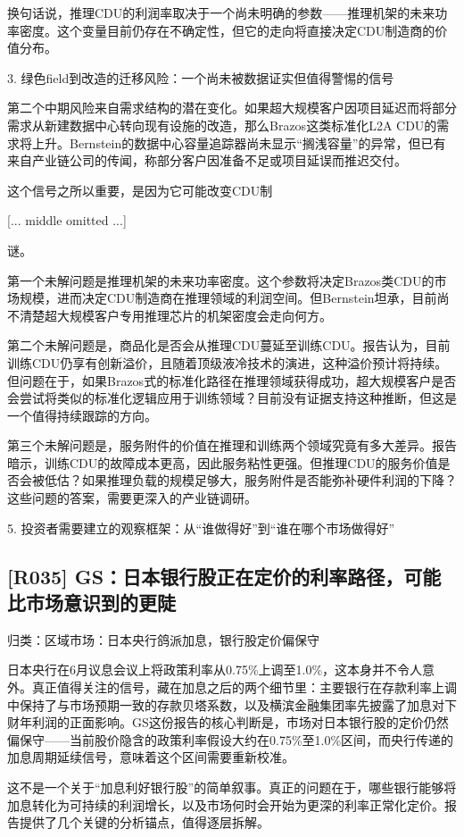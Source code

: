 \documentclass[11pt]{ctexart}
\begin{document}
换句话说，推理CDU的利润率取决于一个尚未明确的参数——推理机架的未来功率密度。这个变量目前仍存在不确定性，但它的走向将直接决定CDU制造商的价值分布。

3. 绿色field到改造的迁移风险：一个尚未被数据证实但值得警惕的信号

第二个中期风险来自需求结构的潜在变化。如果超大规模客户因项目延迟而将部分需求从新建数据中心转向现有设施的改造，那么Brazos这类标准化L2A CDU的需求将上升。Bernstein的数据中心容量追踪器尚未显示“搁浅容量”的异常，但已有来自产业链公司的传闻，称部分客户因准备不足或项目延误而推迟交付。

这个信号之所以重要，是因为它可能改变CDU制

[... middle omitted ...]

谜。

第一个未解问题是推理机架的未来功率密度。这个参数将决定Brazos类CDU的市场规模，进而决定CDU制造商在推理领域的利润空间。但Bernstein坦承，目前尚不清楚超大规模客户专用推理芯片的机架密度会走向何方。

第二个未解问题是，商品化是否会从推理CDU蔓延至训练CDU。报告认为，目前训练CDU仍享有创新溢价，且随着顶级液冷技术的演进，这种溢价预计将持续。但问题在于，如果Brazos式的标准化路径在推理领域获得成功，超大规模客户是否会尝试将类似的标准化逻辑应用于训练领域？目前没有证据支持这种推断，但这是一个值得持续跟踪的方向。

第三个未解问题是，服务附件的价值在推理和训练两个领域究竟有多大差异。报告暗示，训练CDU的故障成本更高，因此服务粘性更强。但推理CDU的服务价值是否会被低估？如果推理负载的规模足够大，服务附件是否能弥补硬件利润的下降？这些问题的答案，需要更深入的产业链调研。

5. 投资者需要建立的观察框架：从“谁做得好”到“谁在哪个市场做得好”

\subsection{[R035] GS：日本银行股正在定价的利率路径，可能比市场意识到的更陡}
{\small\color{refgray}归类：区域市场：日本央行鸽派加息，银行股定价偏保守}

日本央行在6月议息会议上将政策利率从0.75\%上调至1.0\%，这本身并不令人意外。真正值得关注的信号，藏在加息之后的两个细节里：主要银行在存款利率上调中保持了与市场预期一致的存款贝塔系数，以及横滨金融集团率先披露了加息对下财年利润的正面影响。GS这份报告的核心判断是，市场对日本银行股的定价仍然偏保守——当前股价隐含的政策利率假设大约在0.75\%至1.0\%区间，而央行传递的加息周期延续信号，意味着这个区间需要重新校准。

这不是一个关于“加息利好银行股”的简单叙事。真正的问题在于，哪些银行能够将加息转化为可持续的利润增长，以及市场何时会开始为更深的利率正常化定价。报告提供了几个关键的分析锚点，值得逐层拆解。
\end{document}
